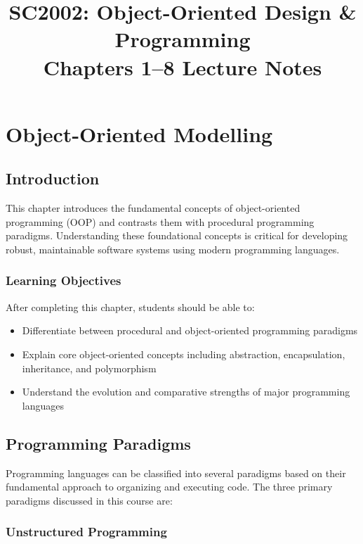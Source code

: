 \documentclass[11pt, a4paper, notitlepage]{report}
\title{\textbf{SC2002: Object-Oriented Design \& Programming}\\[0.5em]
       \large Chapters 1--8 Lecture Notes}
\author{}
\date{}
\makeatletter
\theoremstyle{definition}
\theoremstyle{remark}
\theoremstyle{definition}
\renewcommand\tableofcontents{%
  \section*{\contentsname}%
  \@starttoc{toc}%
}
\makeatother
\begin{document}
\maketitle
\tableofcontents
\newpage

\chapter{Object-Oriented Modelling}
\label{chap:oo-modelling}

\section{Introduction}
\label{sec:ch1-introduction}

This chapter introduces the fundamental concepts of object-oriented programming (OOP) and contrasts them with procedural programming paradigms. Understanding these foundational concepts is critical for developing robust, maintainable software systems using modern programming languages.

\subsection{Learning Objectives}

After completing this chapter, students should be able to:
\begin{itemize}
  \item Differentiate between procedural and object-oriented programming paradigms
  \item Explain core object-oriented concepts including abstraction, encapsulation, inheritance, and polymorphism
  \item Understand the evolution and comparative strengths of major programming languages
\end{itemize}

\section{Programming Paradigms}
\label{sec:ch1-paradigms}

Programming languages can be classified into several paradigms based on their fundamental approach to organizing and executing code. The three primary paradigms discussed in this course are:

\subsection{Unstructured Programming}
\end{document}
